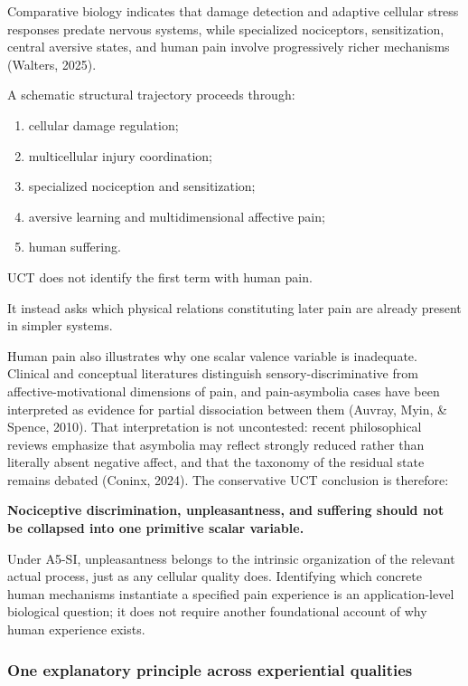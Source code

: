 \documentclass[
  11pt,
  a4paper,
]{article}
\providecommand{\tightlist}{%
  \setlength{\itemsep}{0pt}\setlength{\parskip}{0pt}}
\begin{document}
Comparative biology indicates that damage detection and adaptive
cellular stress responses predate nervous systems, while specialized
nociceptors, sensitization, central aversive states, and human pain
involve progressively richer mechanisms (Walters, 2025).

A schematic structural trajectory proceeds through:

\begin{enumerate}
\def\labelenumi{\arabic{enumi}.}
\tightlist
\item
  cellular damage regulation;
\item
  multicellular injury coordination;
\item
  specialized nociception and sensitization;
\item
  aversive learning and multidimensional affective pain;
\item
  human suffering.
\end{enumerate}

UCT does not identify the first term with human pain.

It instead asks which physical relations constituting later pain are
already present in simpler systems.

Human pain also illustrates why one scalar valence variable is
inadequate. Clinical and conceptual literatures distinguish
sensory-discriminative from affective-motivational dimensions of pain,
and pain-asymbolia cases have been interpreted as evidence for partial
dissociation between them (Auvray, Myin, \& Spence, 2010). That
interpretation is not uncontested: recent philosophical reviews
emphasize that asymbolia may reflect strongly reduced rather than
literally absent negative affect, and that the taxonomy of the residual
state remains debated (Coninx, 2024). The conservative UCT conclusion is
therefore:

\textbf{Nociceptive discrimination, unpleasantness, and suffering should
not be collapsed into one primitive scalar variable.}

Under A5-SI, unpleasantness belongs to the intrinsic organization of the
relevant actual process, just as any cellular quality does. Identifying
which concrete human mechanisms instantiate a specified pain experience
is an application-level biological question; it does not require another
foundational account of why human experience exists.

\hypertarget{one-explanatory-principle-across-experiential-qualities}{%
\subsubsection{One explanatory principle across experiential
qualities}\label{one-explanatory-principle-across-experiential-qualities}}
\end{document}
